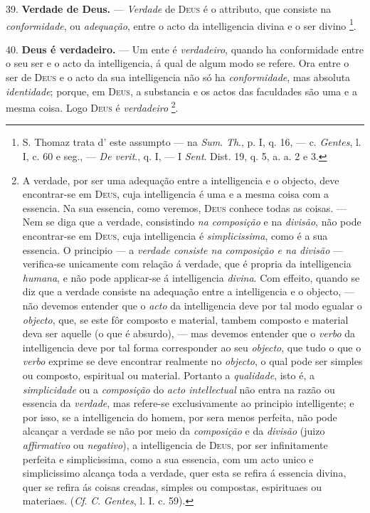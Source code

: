 39. \textbf{Verdade de Deus.} --- \emph{Verdade} de \textsc{Deus} é o attributo, que consiste na \emph{conformidade}, ou \emph{adequação}, entre o acto da intelligencia divina e o ser divino \footnote{S. Thomaz trata d' este assumpto --- na \emph{Sum}. \emph{Th}., p. I, q. 16, --- c. \emph{Gentes}, l. I, c. 60 e seg., --- \emph{De verit}., q. I, --- I \emph{Sent}. Dist. 19, q. 5, a. a. 2 e 3.}.

40. \textbf{Deus é verdadeiro.} --- Um ente é \emph{verdadeiro}, quando ha conformidade entre o seu ser e o acto da intelligencia, á qual de algum modo se refere. Ora entre o ser de \textsc{Deus} e o acto da sua intelligencia não só ha \emph{conformidade}, mas absoluta \emph{identidade}; porque, em \textsc{Deus}, a substancia e os actos das faculdades são uma e a mesma coisa. Logo \textsc{Deus} é \emph{verdadeiro} \footnote{A verdade, por ser uma adequação entre a intelligencia e o objecto, deve encontrar-se em \textsc{Deus}, cuja intelligencia é uma e a mesma coisa com a essencia. Na sua essencia, como veremos, \textsc{Deus} conhece todas as coisas. --- Nem se diga que a verdade, consistindo \emph{na composição} e na \emph{divisão}, não pode encontrar-se em \textsc{Deus}, cuja intelligencia é \emph{simplicissima}, como é a sua essencia. O principio --- a \emph{verdade consiste na composição e na divisão} --- verifica-se unicamente com relação á verdade, que é propria da intelligencia \emph{humana}, e não pode applicar-se á intelligencia \emph{divina}. Com effeito, quando se diz que a verdade consiste na adequação entre a intelligencia e o objecto, --- não devemos entender que o \emph{acto} da intelligencia deve por tal modo egualar o \emph{objecto}, que, se este fôr composto e material, tambem composto e material deva ser aquelle (o que é absurdo), --- mas devemos entender que o \emph{verbo} da intelligencia deve por tal forma corresponder ao seu \emph{objecto}, que tudo o que o \emph{verbo} exprime se deve encontrar realmente no \emph{objecto}, o qual pode ser simples ou composto, espiritual ou material. Portanto a \emph{qualidade}, isto é, a \emph{simplicidade} ou a \emph{composição} do \emph{acto intellectual} não entra na razão ou essencia da \emph{verdade}, mas refere-se exclusivamente ao principio intelligente; e por isso, se a intelligencia do homem, por sera menos perfeita, não pode alcançar a verdade se não por meio da \emph{composição} e da \emph{divisão} (juizo \emph{affirmativo} ou \emph{negativo}), a intelligencia de \textsc{Deus}, por ser infinitamente perfeita e simplicissima, como a sua essencia, com um acto unico e simplicissimo alcança toda a verdade, quer esta se refira á essencia divina, quer se refira ás coisas creadas, simples ou compostas, espirituaes ou materiaes. (\emph{Cf}. \emph{C}. \emph{Gentes}, l. I. c. 59).}.

